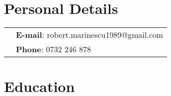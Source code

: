 \documentclass[a4paper,10pt]{article} %
\begin{document}
\pagestyle{empty} %



\par{\bigskip\par} 

\section*{Personal Details}

\begin{tabular}{r|p{15cm}}
& \textbf{E-mail}: robert.marinescu1989@gmail.com \\
& \textbf{Phone}: 0732 246 878 \\
\end{tabular}



\section*{Education}
\end{document}
